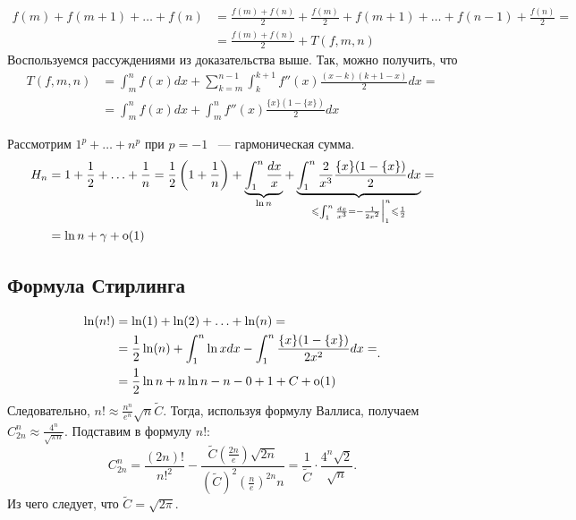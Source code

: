 \begin{cor}
    \[
    \begin{aligned}
	f(m) + f(m+1) + \ldots + f(n)& = \frac{f(m) + f(n)}{2} + \frac{f(m)}{2} + f(m+1) + \ldots + f(n-1) + \frac{f(n)}{2} =\\
				     &= \frac{f(m) + f(n)}{2} + T(f, m, n)
    \end{aligned}
    \]
Воспользуемся рассуждениями из доказательства выше. Так, можно получить, что 
\[
\begin{aligned}
    T(f,m,n) &= \int_m^n f(x)dx + \sum_{k=m}^{n-1} \int_k^{k+1}f''(x)\frac{(x-k)(k+1-x)}{2}dx = \\ 
	     &=\int_m^n f(x)dx + \int_m^n f''(x) \frac{\{x\}(1-\{x\})}{2} dx
\end{aligned}
\]
\end{cor}

\begin{ex} 
    Рассмотрим $1^p+\ldots+n^p$ при $p=-1$ ~--- гармоническая сумма. 
    \[
    \begin{aligned}
	H_n&=1+\frac{1}{2}+\ldots+\frac{1}{n}=\frac{1}{2}\left(1+\frac{1}{n}\right)+\underbrace{\int_1^n \frac{dx}{x}}_{\ln n} +\underbrace{\int_1^n \frac{2}{x^3} \frac{\{x\}(1-\{x\})}{2} dx}_{\leqslant \int_1^n \frac{dx}{x^3}=
	   -\frac{1}{2x^2}\Bigm|_1^n\leqslant \frac{1}{2}} =\\
	   & = \ln n + \gamma + {\mathop{\text{\rm o}}}(1)
    \end{aligned}
    \]
\end{ex}
\subsection{Формула Стирлинга}
\[
\begin{aligned}
    \ln (n!) &= \ln (1) + \ln(2) + \ldots + \ln(n) =\\
	     &= \frac{1}{2}\ln(n) + \int_{1}^{n} \ln x dx - \int_{1}^{n}  \frac{\{x\}(1-\{x\})}{2x^2} dx = \\
	     &= \frac{1}{2}\ln n + n \ln n - n - 0 + 1 + C + {\mathop{\text{\rm o}}}(1)
\end{aligned}
.\]
Следовательно, $ n! \approx \frac{n^{n}}{e^{n}} \sqrt{ n} \tilde C$. Тогда, используя формулу Валлиса, получаем $ C_{2n}^{n} \approx \frac{4^{n}}{\sqrt{ \pi n} } $.
Подставим в формулу $ n!$:
 \[
     C_{2n}^{n} = \frac{(2n)!}{n!^2} - \frac{\tilde C\left(\frac{2n}{e}\right)\sqrt{2n}}{(\tilde C)^2 \left( \frac{n}{e} \right) ^{2n}n} = \frac{1}{\tilde C} \cdot \frac{4^{n} \sqrt{ 2} }{\sqrt{ n} }
.\] 
Из чего следует, что $ \tilde C = \sqrt{2 \pi}$.

